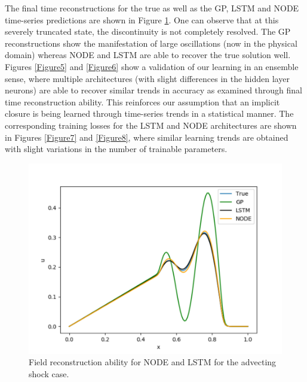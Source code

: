 \documentclass[preprint,12pt]{elsarticle}
\begin{document}
The final time reconstructions for the true as well as the GP, LSTM and NODE time-series predictions are shown in Figure \ref{Figure4}. One can observe that at this severely truncated state, the discontinuity is not completely resolved. The GP reconstructions show the manifestation of large oscillations (now in the physical domain) whereas NODE and LSTM are able to recover the true solution well. Figures \ref{Figure5} and \ref{Figure6} show a validation of our learning in an ensemble sense, where multiple architectures (with slight differences in the hidden layer neurons) are able to recover similar trends in accuracy as examined through final time reconstruction ability. This reinforces our assumption that an implicit closure is being learned through time-series trends in a statistical manner. The corresponding training losses for the LSTM and NODE architectures are shown in Figures \ref{Figure7} and \ref{Figure8}, where similar learning trends are obtained with slight variations in the number of trainable parameters. 

\begin{figure}
	\centering
	\includegraphics[width=\textwidth]{Figure_5.pdf}
	\caption{Field reconstruction ability for NODE and LSTM for the advecting shock case.}
	\label{Figure4}
\end{figure}
\end{document}
